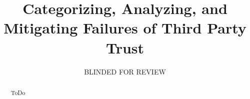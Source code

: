 \documentclass[11pt,letterpaper]{article}
\begin{document}
\title{Categorizing, Analyzing, and Mitigating Failures of Third Party Trust}

\author{BLINDED FOR REVIEW}

\date{}

\maketitle

\begin{abstract}
ToDo
\end{abstract}











\end{document}
